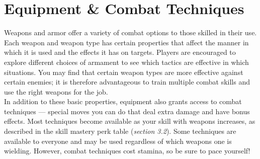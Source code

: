 \chapter{Equipment \& Combat Techniques}
Weapons and armor offer a variety of combat options to those skilled in their use. Each weapon and weapon type has certain properties that affect the manner in which it is used and the effects it has on targets. Players are encouraged to explore different choices of armament to see which tactics are effective in which situations. You may find that certain weapon types are more effective against certain enemies; it is therefore advantageous to train multiple combat skills and use the right weapons for the job.\\

In addition to these basic properties, equipment also grants access to combat techniques --- special moves you can do that deal extra damage and have bonus effects. Most techniques become available as your skill with weapons increases, as described in the skill mastery perk table (\textit{section 3.2}). Some techniques are available to everyone and may be used regardless of which weapons one is wielding. However, combat techniques cost stamina, so be sure to pace yourself!

